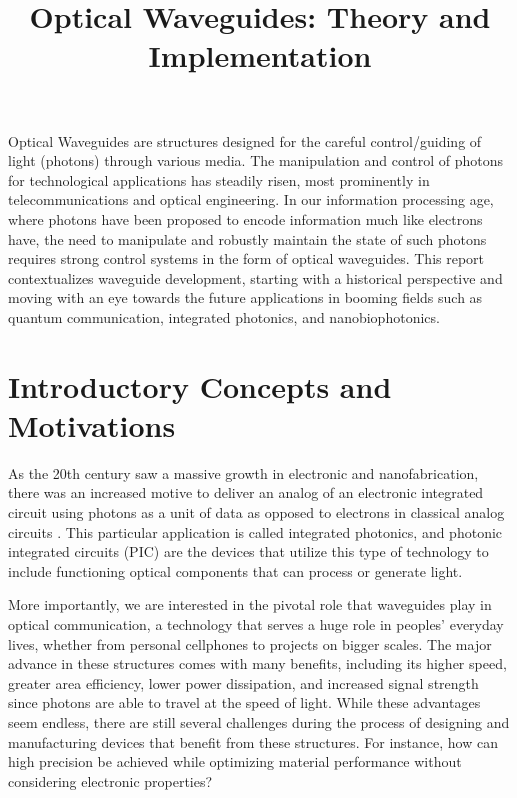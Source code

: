 \documentclass[10pt]{article}
\begin{document}
\noindent



\title{Optical Waveguides: Theory and Implementation}




\maketitle


\abstract
Optical Waveguides are structures designed for the careful control/guiding of light (photons) through various media. The manipulation and control of photons 
for technological applications has steadily risen, most prominently in telecommunications and optical engineering. In our information 
processing age, where photons have been proposed to encode information much like electrons have, the need to manipulate and robustly maintain the state 
of such photons requires strong control systems in the form of optical waveguides. This report contextualizes waveguide development, 
starting with a historical perspective and moving with an eye towards the future applications in booming fields such as quantum communication, integrated photonics, 
and nanobiophotonics. 

\section{Introductory Concepts and Motivations}

As the 20th century saw a massive growth in electronic and nanofabrication, 
there was an increased motive to deliver an analog of an electronic integrated
circuit using photons as a unit of data as opposed to electrons in classical analog circuits \cite{ref01}.
This particular application is called integrated photonics, and photonic integrated circuits (PIC) 
are the devices that utilize this type of technology to include functioning optical components that can 
process or generate light. 

More importantly, we are interested in the pivotal role that waveguides play in 
optical communication, a technology that serves a huge role in peoples’ everyday lives, whether from personal 
cellphones to projects on bigger scales. The major advance in these structures comes with many benefits, 
including its higher speed, greater area efficiency, lower power dissipation, and increased signal strength 
since photons are able to travel at the speed of light. While these advantages seem endless, there are still 
several challenges during the process of designing and manufacturing devices that benefit from these structures.
For instance, how can high precision be achieved while optimizing material performance without considering electronic 
properties? 
\end{document}
